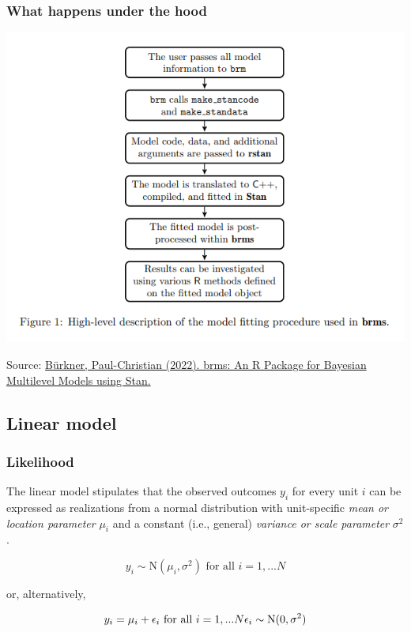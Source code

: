 \documentclass[
  11pt,
]{article}
\begin{document}
\hypertarget{what-happens-under-the-hood}{%
\subsubsection{What happens under the hood}\label{what-happens-under-the-hood}}

\begin{center}\includegraphics[width=0.75\linewidth]{images/procedure} \end{center}

Source: \href{https://cloud.r-project.org/web/packages/brms/vignettes/brms_overview.pdf}{Bürkner, Paul-Christian (2022). brms: An R Package for Bayesian Multilevel Models
using Stan.}

\hypertarget{linear-model}{%
\subsection{Linear model}\label{linear-model}}

\hypertarget{likelihood}{%
\subsubsection{Likelihood}\label{likelihood}}

The linear model stipulates that the observed outcomes \(y_i\) for every unit \(i\) can be expressed as realizations from a normal distribution with unit-specific \emph{mean or location parameter} \(\mu_i\) and a constant (i.e., general) \emph{variance or scale parameter} \(\sigma^2\).

\[y_i \sim \text{N}(\mu_i, \sigma^2) \text{ for all }i = 1,...N\]

or, alternatively,

\[y_i = \mu_i + \epsilon_i  \text{ for all }i = 1,...N \\ \epsilon_i \sim \text{N}(0, \sigma^2)\]
\end{document}
